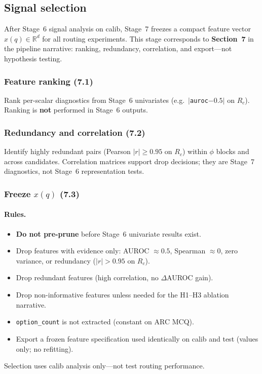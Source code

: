 \subsection{Signal selection}
\label{sec:signal-selection}

After Stage~6 signal analysis on calib, Stage~7 freezes a compact feature vector $x(q)\in\mathbb{R}^d$ for all routing experiments.
This stage corresponds to \textbf{Section~7} in the pipeline narrative: ranking, redundancy, correlation, and export---not hypothesis testing.

\subsubsection{Feature ranking (7.1)}
\label{sec:signal-selection-ranking}

Rank per-scalar diagnostics from Stage~6 univariates (e.g.\ $|$\texttt{auroc}$-0.5|$ on $R_c$).
Ranking is \textbf{not} performed in Stage~6 outputs.

\subsubsection{Redundancy and correlation (7.2)}
\label{sec:signal-selection-redundancy}

Identify highly redundant pairs (Pearson $|r|\ge 0.95$ on $R_c$) within $\phi$ blocks and across candidates.
Correlation matrices support drop decisions; they are Stage~7 diagnostics, not Stage~6 representation tests.

\subsubsection{Freeze $x(q)$ (7.3)}
\label{sec:signal-selection-freeze}

\paragraph{Rules.}
\begin{itemize}
  \item \textbf{Do not pre-prune} before Stage~6 univariate results exist.
  \item Drop features with evidence only: AUROC $\approx 0.5$, Spearman $\approx 0$, zero variance, or redundancy ($|r|>0.95$ on $R_c$).
  \item Drop redundant features (high correlation, no $\Delta$AUROC gain).
  \item Drop non-informative features unless needed for the H1--H3 ablation narrative.
  \item \texttt{option\_count} is not extracted (constant on ARC MCQ).
  \item Export a frozen feature specification used identically on calib and test (values only; no refitting).
\end{itemize}

Selection uses calib analysis only---not test routing performance.

